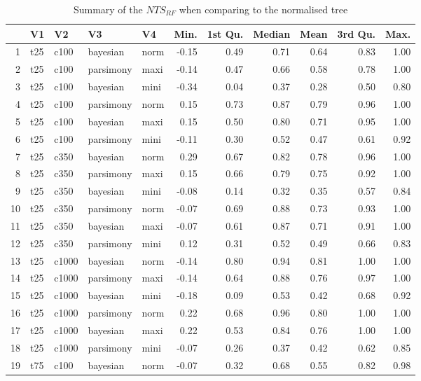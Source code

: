 \documentclass[12pt,letterpaper]{article}
\begin{document}
\begin{longtable}{rllllrrrrrr}
\caption{Summary of the $NTS_{RF}$ when comparing to the normalised tree}\\

  \hline
 & V1 & V2 & V3 & V4 & Min. & 1st Qu. & Median & Mean & 3rd Qu. & Max. \\ 
  \hline
1 & t25 & c100 & bayesian & norm & -0.15 & 0.49 & 0.71 & 0.64 & 0.83 & 1.00 \\ 
  2 & t25 & c100 & parsimony & maxi & -0.14 & 0.47 & 0.66 & 0.58 & 0.78 & 1.00 \\ 
  3 & t25 & c100 & bayesian & mini & -0.34 & 0.04 & 0.37 & 0.28 & 0.50 & 0.80 \\ 
  4 & t25 & c100 & parsimony & norm & 0.15 & 0.73 & 0.87 & 0.79 & 0.96 & 1.00 \\ 
  5 & t25 & c100 & bayesian & maxi & 0.15 & 0.50 & 0.80 & 0.71 & 0.95 & 1.00 \\ 
  6 & t25 & c100 & parsimony & mini & -0.11 & 0.30 & 0.52 & 0.47 & 0.61 & 0.92 \\ 
  7 & t25 & c350 & bayesian & norm & 0.29 & 0.67 & 0.82 & 0.78 & 0.96 & 1.00 \\ 
  8 & t25 & c350 & parsimony & maxi & 0.15 & 0.66 & 0.79 & 0.75 & 0.92 & 1.00 \\ 
  9 & t25 & c350 & bayesian & mini & -0.08 & 0.14 & 0.32 & 0.35 & 0.57 & 0.84 \\ 
  10 & t25 & c350 & parsimony & norm & -0.07 & 0.69 & 0.88 & 0.73 & 0.93 & 1.00 \\ 
  11 & t25 & c350 & bayesian & maxi & -0.07 & 0.61 & 0.87 & 0.71 & 0.91 & 1.00 \\ 
  12 & t25 & c350 & parsimony & mini & 0.12 & 0.31 & 0.52 & 0.49 & 0.66 & 0.83 \\ 
  13 & t25 & c1000 & bayesian & norm & -0.14 & 0.80 & 0.94 & 0.81 & 1.00 & 1.00 \\ 
  14 & t25 & c1000 & parsimony & maxi & -0.14 & 0.64 & 0.88 & 0.76 & 0.97 & 1.00 \\ 
  15 & t25 & c1000 & bayesian & mini & -0.18 & 0.09 & 0.53 & 0.42 & 0.68 & 0.92 \\ 
  16 & t25 & c1000 & parsimony & norm & 0.22 & 0.68 & 0.96 & 0.80 & 1.00 & 1.00 \\ 
  17 & t25 & c1000 & bayesian & maxi & 0.22 & 0.53 & 0.84 & 0.76 & 1.00 & 1.00 \\ 
  18 & t25 & c1000 & parsimony & mini & -0.07 & 0.26 & 0.37 & 0.42 & 0.62 & 0.85 \\ 
  19 & t75 & c100 & bayesian & norm & -0.07 & 0.32 & 0.68 & 0.55 & 0.82 & 0.98 \\ 

\end{longtable}
\end{document}
